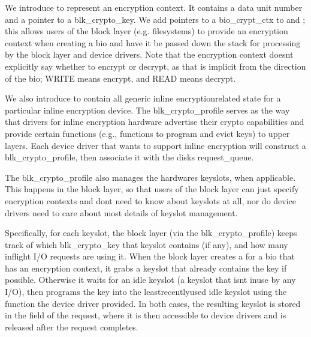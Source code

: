 \documentclass[a4paper,11pt,english]{sphinxmanual}
\begin{document}
We introduce  to represent an encryption context.  It
contains a data unit number and a pointer to a blk\_crypto\_key.  We add pointers
to a bio\_crypt\_ctx to  and ; this allows users
of the block layer (e.g. filesystems) to provide an encryption context when
creating a bio and have it be passed down the stack for processing by the block
layer and device drivers.  Note that the encryption context doesn\textquotesingle{}t explicitly
say whether to encrypt or decrypt, as that is implicit from the direction of the
bio; WRITE means encrypt, and READ means decrypt.

We also introduce  to contain all generic inline
encryption\sphinxhyphen{}related state for a particular inline encryption device.  The
blk\_crypto\_profile serves as the way that drivers for inline encryption hardware
advertise their crypto capabilities and provide certain functions (e.g.,
functions to program and evict keys) to upper layers.  Each device driver that
wants to support inline encryption will construct a blk\_crypto\_profile, then
associate it with the disk\textquotesingle{}s request\_queue.

The blk\_crypto\_profile also manages the hardware\textquotesingle{}s keyslots, when applicable.
This happens in the block layer, so that users of the block layer can just
specify encryption contexts and don\textquotesingle{}t need to know about keyslots at all, nor do
device drivers need to care about most details of keyslot management.

Specifically, for each keyslot, the block layer (via the blk\_crypto\_profile)
keeps track of which blk\_crypto\_key that keyslot contains (if any), and how many
in\sphinxhyphen{}flight I/O requests are using it.  When the block layer creates a
 for a bio that has an encryption context, it grabs a keyslot
that already contains the key if possible.  Otherwise it waits for an idle
keyslot (a keyslot that isn\textquotesingle{}t in\sphinxhyphen{}use by any I/O), then programs the key into the
least\sphinxhyphen{}recently\sphinxhyphen{}used idle keyslot using the function the device driver provided.
In both cases, the resulting keyslot is stored in the  field of
the request, where it is then accessible to device drivers and is released after
the request completes.
\end{document}
